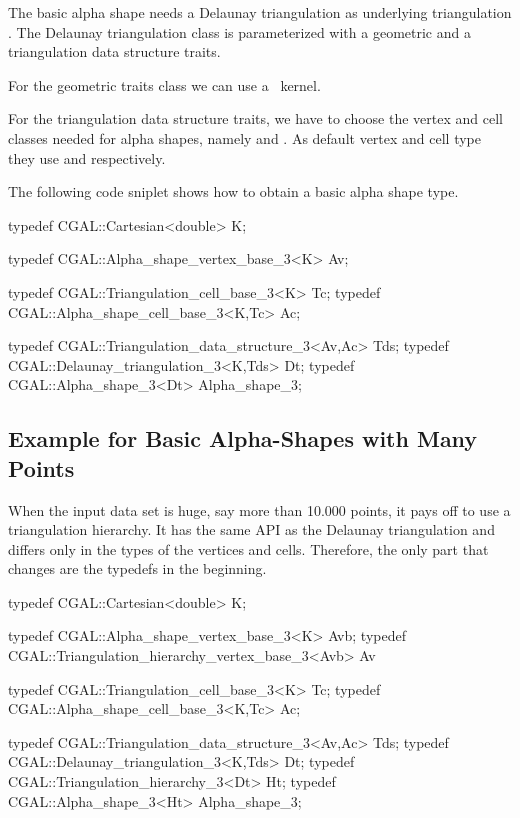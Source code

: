The basic alpha shape needs a Delaunay triangulation as
underlying triangulation .  The Delaunay triangulation class is
parameterized with a geometric and a triangulation data structure traits.

For the geometric traits class we can use a \cgal\ kernel.

For the triangulation data structure traits, we have to
choose the vertex and cell classes needed for alpha shapes,
namely  and .
As default vertex and cell type they use 
and   respectively. 



The following code sniplet shows how to obtain a basic
alpha shape type.

\begin{cprog}
typedef CGAL::Cartesian<double> K;

typedef CGAL::Alpha_shape_vertex_base_3<K> Av;

typedef CGAL::Triangulation_cell_base_3<K> Tc;
typedef CGAL::Alpha_shape_cell_base_3<K,Tc> Ac;

typedef CGAL::Triangulation_data_structure_3<Av,Ac> Tds;
typedef CGAL::Delaunay_triangulation_3<K,Tds> Dt;
typedef CGAL::Alpha_shape_3<Dt> Alpha_shape_3;
\end{cprog}


\subsection{Example for Basic Alpha-Shapes with Many Points
         \label{I1_SectClassicAS3DHier}}

When the input data set is huge, say more than 10.000 points, it pays
off to use a triangulation hierarchy. It has the same API as the
Delaunay triangulation and differs only in the types of the vertices
and cells. Therefore, the only part that changes are the typedefs in the beginning.

\begin{cprog}
typedef CGAL::Cartesian<double> K;

typedef CGAL::Alpha_shape_vertex_base_3<K> Avb;
typedef CGAL::Triangulation_hierarchy_vertex_base_3<Avb> Av 

typedef CGAL::Triangulation_cell_base_3<K> Tc;
typedef CGAL::Alpha_shape_cell_base_3<K,Tc> Ac;

typedef CGAL::Triangulation_data_structure_3<Av,Ac> Tds;
typedef CGAL::Delaunay_triangulation_3<K,Tds> Dt;
typedef CGAL::Triangulation_hierarchy_3<Dt> Ht;
typedef CGAL::Alpha_shape_3<Ht> Alpha_shape_3;
\end{cprog}


